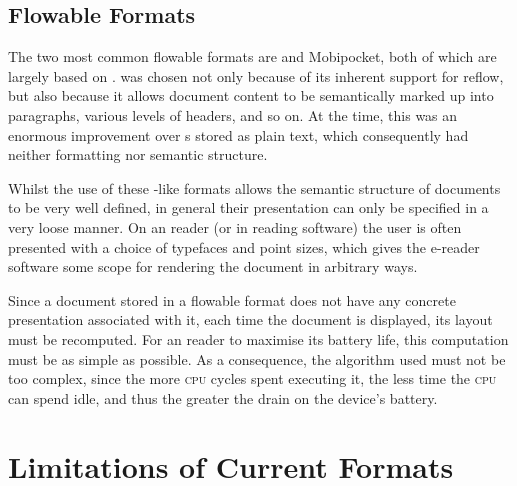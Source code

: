 

\subsection{Flowable Formats}
\label{sec:flowableformats}

The two most common flowable \ebook{} formats are \epub{} and Mobipocket, both of which are largely based on \html{}. \html{} was chosen not only because of its inherent support for reflow, but also because it allows document content to be semantically marked up into paragraphs, various levels of headers, and so on. At the time, this was an enormous improvement over \ebook{}s stored as plain text, which consequently had neither formatting nor semantic structure. 

Whilst the use of these \html{}-like formats allows the semantic structure of documents to be very well defined, in general their presentation can only be specified in a very loose manner. On an \ebook{} reader (or in \ebook{} reading software) the user is often presented with a choice of typefaces and point sizes, which gives the e-reader software some scope for rendering the document in arbitrary ways.

Since a document stored in a flowable format does not have any concrete presentation associated with it, each time the document is displayed, its layout must be recomputed. For an \ebook{} reader to maximise its battery life, this computation must be as simple as possible. As a consequence, the algorithm used must not be too complex, since the more \textsc{cpu} cycles spent executing it, the less time the \textsc{cpu} can spend idle, and thus the greater the drain on the device's battery.\hspace{0pt}\cite{Pinkney2011}


\section{Limitations of Current Formats}

